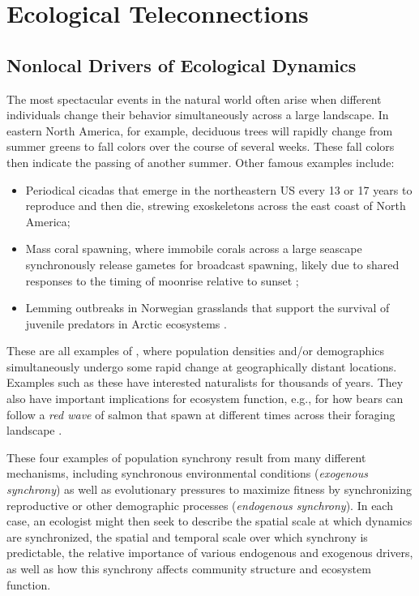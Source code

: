 \chapter{Ecological Teleconnections}\label{chap:Chap9_EOF}

\section{Nonlocal Drivers of Ecological Dynamics}

The most spectacular events in the natural world often arise when different individuals change their behavior simultaneously across a large landscape. In eastern North America, for example, deciduous trees will rapidly change from summer greens to fall colors over the course of several weeks.  These fall colors then indicate the passing of another summer.  Other famous examples include:
\begin{itemize}
    \item Periodical cicadas that emerge in the northeastern US every 13 or 17 years to reproduce and then die, strewing exoskeletons across the east coast of North America; 

    \item Mass coral spawning, where immobile corals across a large seascape synchronously release gametes for broadcast spawning, likely due to shared responses to the timing of moonrise relative to sunset \cite{lin_moonrise_2021};

    \item Lemming outbreaks in Norwegian grasslands that support the survival of juvenile predators in Arctic ecosystems \cite{ims_determinants_2011}.
\end{itemize}
These are all examples of , where population densities and/or demographics simultaneously undergo some rapid change at geographically distant locations.  Examples such as these have interested naturalists for thousands of years.  They also have important implications for ecosystem function, e.g., for how bears can follow a \textit{red wave} of salmon that spawn at different times across their foraging landscape \cite{deacy_kodiak_2016}.  

These four examples of population synchrony result from many different mechanisms, including synchronous environmental conditions (\textit{exogenous synchrony}) as well as evolutionary pressures to maximize fitness by synchronizing reproductive or other demographic processes (\textit{endogenous synchrony}).  In each case, an ecologist might then seek to describe the spatial scale at which dynamics are synchronized, the spatial and temporal scale over which synchrony is predictable, the relative importance of various endogenous and exogenous drivers, as well as how this synchrony affects community structure and ecosystem function.  

